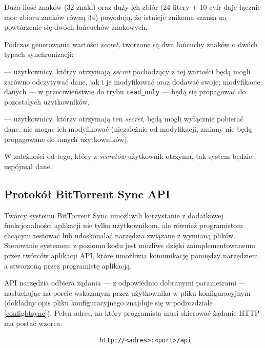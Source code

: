 \documentclass[polish,a4paper,twoside]{ppfcmthesis}
\begin{document}
Duża ilość znaków ($32$ znaki) oraz duży ich zbiór ($24$ litery $+$ $10$ cyfr daje łącznie moc zbioru znaków równą $34$) powodują, że istnieje znikoma szansa na powtórzenie się dwóch łańcuchów znakowych.

Podczas generowania wartości \emph{secret}, tworzone są dwa łańcuchy znaków o dwóch typach synchronizacji:

\begin{description}[noitemsep]
  \item[read\_write] --- użytkownicy, którzy otrzymają \emph{secret} pochodzący z tej wartości będą mogli zarówno odczytywać dane, jak i je modyfikować oraz dodawać swoje; modyfikacje danych --- w przeciwieństwie do trybu \texttt{read\_only} --- będą się propagować do pozostałych użytkowników,
  
  \item[read\_only] --- użytkownicy, którzy otrzymają ten \emph{secret}, będą mogli wyłącznie pobierać dane, nie mogąc ich modyfikować (niezależnie od modyfikacji, zmiany nie będą propagowane do innych użytkowników).
\end{description}

W zależności od tego, który z \emph{secretów} użytkownik otrzyma, tak system będzie uspójniał dane.

\subsection{Protokół BitTorrent Sync API}

\label{btsyncapiproto}

Twórcy systemu BitTorrent Sync umożliwili korzystanie z dodatkowej funkcjonalności aplikacji nie tylko użytkownikom, ale również programistom chcącym testować lub udoskonalać narzędzia związane z wymianą plików. Sterowanie systemem z poziomu kodu jest możliwe dzięki zaimplementowanemu przez twórców aplikacji API, które umożliwia komunikację pomiędzy narzędziem a stworzoną przez programistę aplikacją.

API narzędzia odbiera żądania --- z odpowiednio dobranymi parametrami --- nasłuchując na porcie wskazanym przez użytkownika w pliku konfiguracyjnym (dokładny opis pliku konfiguracyjnego znajduje się w podrozdziale \ref{configbtsync}). Pełen adres, na który programista musi skierować żądanie HTTP ma postać wzorca:
\begin{verbatim}
                          http://<adres>:<port>/api
\end{verbatim}
\end{document}
